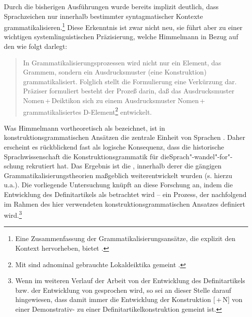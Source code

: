 Durch die bisherigen Ausführungen wurde bereits implizit deutlich, dass Sprachzeichen nur innerhalb bestimmter syntagmatischer Kontexte grammatikalisieren.\footnote{Eine Zusammenfassung der Grammatikalisierungsansätze, die explizit den Kontext hervorheben, bietet \textcite{Traugott2003,Traugott2008a}.} 
Diese Erkenntnis ist zwar nicht neu, sie führt aber zu einer wichtigen systemlinguistischen Präzisierung, welche Himmelmann in Bezug auf den  wie folgt darlegt: \blockcquote[31]{Himmelmann1997}{In Grammatikalisierungsprozessen  wird nicht nur ein Element, das Grammem, sondern ein Ausdrucksmuster (eine Konstruktion) grammatikalisiert. Folglich stellt die Formulierung   eine Verkürzung dar. Präziser formuliert besteht der Prozeß darin, daß das Ausdrucksmuster Nomen\,+\,Deiktikon sich zu einem Ausdrucksmuster Nomen\,+\,grammatikalisiertes D-Element\footnote{Mit  sind adnominal gebrauchte Lokaldeiktika gemeint \parencite[6]{Himmelmann1997}.} 
 entwickelt.} 
Was Himmelmann vortheoretisch als   bezeichnet, ist in kon\-struk\-tions\-grammatischen Ansätzen die zentrale Einheit von Sprachen \parencite[s. u.a.][]{Goldberg1995,Goldberg2006}. Daher erscheint es rückblickend fast als logische Konsequenz, dass die historische Sprachwissenschaft die Konstruktionsgrammatik für die\linebreak Sprach"-wandel"-for"-schung rekrutiert hat. Das Ergebnis ist die  \parencite[vgl. u.a.][]{Barddal2015}, innerhalb derer die gängigen Grammatikalisierungstheorien maßgeblich weiterentwickelt wurden (s. hierzu u.a.\citealt{Traugott2003,Bergs2008,Diewald2008,Fried2013,Traugott2013}). Die vorliegende Untersuchung knüpft an diese Forschung an, indem die Entwicklung des Definitartikels als  betrachtet wird -- ein Prozess, der nachfolgend im Rahmen des hier verwendeten konstruktionsgrammatischen Ansatzes definiert wird.\footnote{Wenn im weiteren Verlauf der Arbeit von der Entwicklung des Definitartikels bzw. der Entwicklung von  gesprochen wird, so sei an dieser Stelle darauf hingewiesen, dass damit immer die Entwicklung der Konstruktion  [\,+\,N] von einer Demonstrativ-   zu einer Definitartikelkonstruktion gemeint ist.}  

